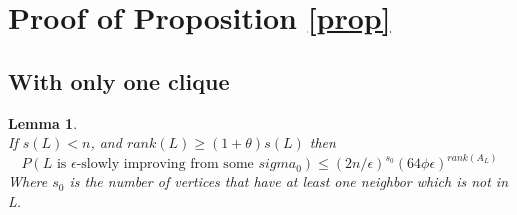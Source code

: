 \documentclass[12pt]{article}
\newtheorem{lemma}[theorem]{Lemma}
\begin{document}
\section{Proof of Proposition \ref{prop}}
\label{coreProof}

\subsection{With only one clique}

\begin{lemma} \leavevmode \\
\label{boundN}
If $s(L) < n$, and $rank(L) \geq (1+\theta)s(L)$ then \\
\begin{equation*}
P(L \text{ is }\epsilon\text{-slowly improving from some }sigma_0)  \leq (2n/\epsilon)^{s_0}(64\phi\epsilon)^{rank(A_L)}
\end{equation*}
Where $s_0$ is the number of vertices that have at least one neighbor which is not in L. 
\end{lemma}
\end{document}
